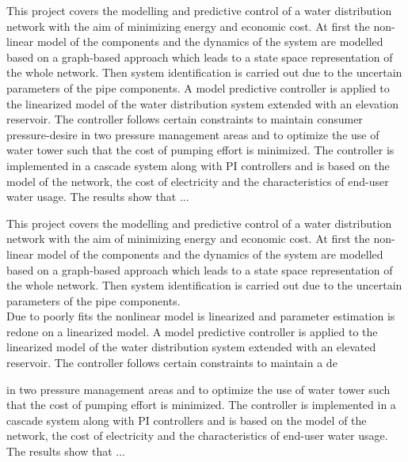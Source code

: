 This project covers the modelling and predictive control of a water distribution network with the aim of minimizing energy and economic cost. 
\newline
At first the non-linear model of the components and the dynamics of the system are modelled based on a graph-based approach which leads to a state space representation of the whole network. Then system identification is carried out due to the uncertain parameters of the pipe components.
\newline
A model predictive controller is applied to the linearized model of the water distribution system extended with an elevation reservoir. The controller follows certain constraints to maintain consumer pressure-desire in two pressure management areas and to optimize the use of water tower such that the cost of pumping effort is minimized. 
The controller is implemented in a cascade system along with PI controllers and is based on the model of the network, the cost of electricity and the characteristics of end-user water usage. 
\newline
The results show that ...









This project covers the modelling and predictive control of a water distribution network with the aim of minimizing energy and economic cost. 
\newline
At first the non-linear model of the components and the dynamics of the system are modelled based on a graph-based approach which leads to a state space representation of the whole network. Then system identification is carried out due to the uncertain parameters of the pipe components.\\
Due to poorly fits the nonlinear model is linearized and parameter estimation is redone on a linearized model.
\newline
A model predictive controller is applied to the linearized model of the water distribution system extended with an elevated reservoir. The controller follows certain constraints to maintain a de

 in two pressure management areas and to optimize the use of water tower such that the cost of pumping effort is minimized. 
The controller is implemented in a cascade system along with PI controllers and is based on the model of the network, the cost of electricity and the characteristics of end-user water usage. 
\newline
The results show that ...
